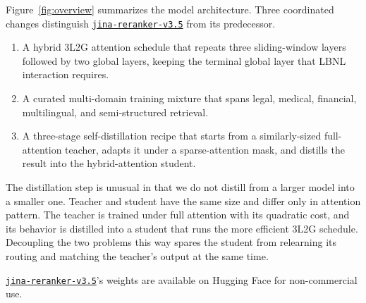 \documentclass{article}
\newcommand{\jrrvthree}{\href{https://huggingface.co/jinaai/jina-reranker-v3}{\texttt{jina-reranker-v3}}}
\newcommand{\jrrvthreefive}{\href{https://huggingface.co/jinaai/jina-reranker-v3.5}{\texttt{jina-reranker-v3.5}}}
\newcommand{\qwenrankerlarge}{\texttt{Qwen3-Reranker-4B}}
\newcommand{\jinaembedsmall}{\texttt{jina-embeddings-v5-text-small}}
\begin{document}
Figure~\ref{fig:overview} summarizes the model architecture. Three coordinated changes distinguish \jrrvthreefive{} from its predecessor.

\begin{enumerate}[label=\roman*]
    \item A hybrid 3L2G attention schedule that repeats three sliding-window layers followed by two global layers, keeping the terminal global layer that LBNL interaction requires.
    \item A curated multi-domain training mixture that spans legal, medical, financial, multilingual, and semi-structured retrieval.
    \item A three-stage self-distillation recipe that starts from a similarly-sized full-attention teacher, adapts it under a sparse-attention mask, and distills the result into the hybrid-attention student.
\end{enumerate}

The distillation step is unusual in that we do not distill from a larger model into a smaller one. Teacher and student have the same size and differ only in attention pattern. The teacher is trained under full attention with its quadratic cost, and its behavior is distilled into a student that runs the more efficient 3L2G schedule. Decoupling the two problems this way spares the student from relearning its routing and matching the teacher's output at the same time.

\jrrvthreefive{}'s weights are available on Hugging Face for non-commercial use.


\end{document}
